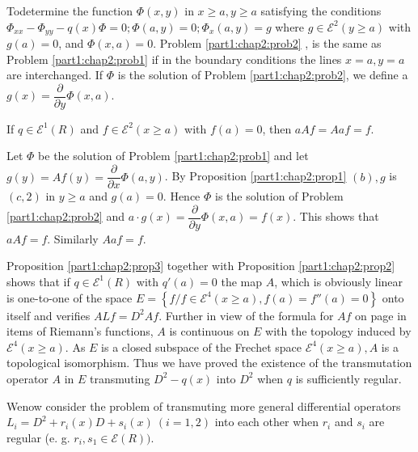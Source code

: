 \begin{prob}\label{part1:chap2:prob2}%
  To\pageoriginale determine the function $\Phi (x, y)$ in $x \geq a, y \geq a $
  satisfying the conditions $\Phi _{xx} - \Phi_{yy} - q (x) \Phi = 0;
  \Phi (a, y ) = 0 ; \Phi_x ( a, y) = g $ where $g \in \mathscr{E}^2
  (y \geq a)$ with $g (a ) = 0 $, and $\Phi (x, a ) =
  0$. Problem \ref{part1:chap2:prob2} ,
  is the same as Problem \ref{part1:chap2:prob1} if in the boundary conditions the lines
  $x = a,  y = a$ are interchanged. If $\Phi$ is the solution of
  Problem \ref{part1:chap2:prob2},  we define a $g (x) =
  \dfrac{\partial}{\partial y} \Phi (x, a)$.  
\end{prob}

\begin{proposition}\label{part1:chap2:prop3}%
  If $q \in \mathscr{E}^1 (R)$ and $f \in \mathscr{E}^2 (x \geq a)$
  with $f(a) = 0 $, then $a Af = A a f = f $.  
\end{proposition}

Let $\Phi$ be the solution of Problem \ref{part1:chap2:prob1} and let $g(y) = Af (y) =
\dfrac{\partial}{\partial x} \Phi (a,  y)$. By
Proposition \ref{part1:chap2:prop1} $(b), g$
is $(c, 2)$ in $y \geq a$ and  $g(a) = 0$. Hence $\Phi$ is the
solution of Problem \ref{part1:chap2:prob2} and $a \cdot g(x) =
\dfrac{\partial }{\partial y} \Phi 
(x, a )  = f (x) $. This shows that $a A f = f $. Similarly $A a f =f$.   
 
Proposition \ref{part1:chap2:prop3} together with
Proposition \ref{part1:chap2:prop2} shows that if $q \in
\mathscr{E}^1 (R)$ with $q' (a) = 0$ the map $A$, which is obviously
linear is one-to-one of the space $E = \left\{f / f \in \mathscr{E}^4
(x \geq a), f (a) = f'' (a) = 0\right\}$ onto itself and verifies $ALf =
D^2 Af$. Further in view of the formula for $Af$ on page \pageref{page16} in items
of Riemann's functions, $A$ is continuous on $E$ with the topology
induced by $\mathscr{E}^4 (x \geq a)$. As $E$ is a closed subspace of
the Frechet space $\mathscr{E}^4 (x \geq a ), A$ is a topological
isomorphism. Thus we have proved the existence of the transmutation
operator $A$ in $E$ transmuting $D^2 - q(x)$ into $D^2$ when $q$ is
sufficiently regular.  
 
 We\pageoriginale now consider the problem of transmuting more general differential
 operators $L_i = D^2 + r_i (x) D + s_i (x)~(i = 1, 2)$ into each
 other when $r_i$ and $s_i$ are regular (e. g. $ r_i,  s_1 \in
 \mathscr{E} (R))$.
  
